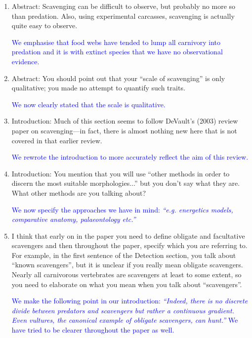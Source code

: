 \documentclass[12pt,letterpaper]{article}
\begin{document}
\begin{enumerate}
\item{Abstract: Scavenging can be difficult to observe, but probably no more so than predation.
Also, using experimental carcasses, scavenging is actually quite easy to observe.}

\textcolor{blue}{We emphasise that food webs have tended to lump all carnivory into predation and it is with extinct species that we have no observational evidence.} 

\item{Abstract: You should point out that your ``scale of scavenging'' is only qualitative; you made no attempt to quantify such traits.}

\textcolor{blue}{We now clearly stated that the scale is qualitative.} 

\item{Introduction: Much of this section seems to follow DeVault's (2003) review paper on scavenging—in fact, there is almost nothing new here that is not covered in that earlier review.}

\textcolor{blue}{We rewrote the introduction to more accurately reflect the aim of this review.} %

\item{Introduction: You mention that you will use ``other methods in order to discern the most suitable morphologies...''  but you don't say what they are. What other methods are you talking about?}

\textcolor{blue}{We now specify the approaches we have in mind:  \textit{``e.g. energetics models, comparative anatomy, palaeontology etc.'' }}

\item{I think that early on in the paper you need to define obligate and facultative scavengers and then throughout the paper, specify which you are referring to. For example, in the first sentence of the Detection section, you talk about ``known scavengers'', but it is unclear if you really mean obligate scavengers. Nearly all carnivorous vertebrates are scavengers at least to some extent, so you need to elaborate on what you mean when you talk about ``scavengers''.}

\textcolor{blue} {We make the following point in our introduction: \textit{``Indeed, there is no discrete divide between predators and scavengers but rather a continuous gradient. Even vultures, the canonical example of obligate scavengers, can hunt.''} We have tried to be clearer throughout the paper as well.}


\end{enumerate}
\end{document}
